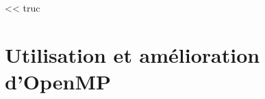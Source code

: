 
\begin{savequote}[6cm]
<< truc
\end{savequote}

\chapter{Utilisation et amélioration d'OpenMP}\label{chap:contrib:openmp}
\chaptertoc


%










